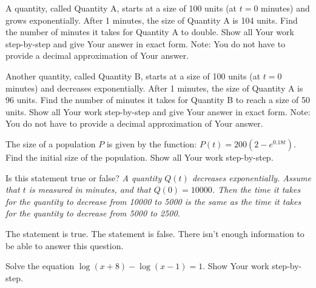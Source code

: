 \documentclass[11pt,answers]{exam}
\begin{document}
\begin{questions}


\addpoints



\question[2] A quantity, called Quantity A, starts at a size of 100 units (at $t=0$ minutes) and grows exponentially. After 1 minutes, the size of Quantity A is 104 units. Find the number of minutes it takes for Quantity A to double.    Show all Your work step-by-step and give Your answer in exact form. Note: You do not have to provide a decimal approximation of Your answer.


\fillwithdottedlines{3cm}

\question[2] Another quantity, called Quantity B, starts at a size of 100 units (at $t=0$ minutes) and decreases exponentially. After 1 minutes, the size of Quantity A is 96 units. Find the number of minutes it takes for Quantity B to reach a size of 50 units.     Show all Your work step-by-step and give Your answer in exact form. Note: You do not have to provide a decimal approximation of Your answer.

\fillwithdottedlines{3cm}

\question[2] The size of a population $P$ is given by the function: $\displaystyle P(t)=200(2-e^{0.18t})$. Find the initial size of the population. Show all Your work step-by-step.

\fillwithdottedlines{3cm}

\bonusquestion[1] Is this statement true or false? {\emph {A quantity $Q(t)$ decreases exponentially. Assume that $t$ is measured in minutes, and that $Q(0)=10000$. Then the time it takes for the quantity to decrease from 10000 to 5000 is the same as the time it takes for the quantity to decrease from 5000 to 2500. }}

\begin{oneparchoices}
\choice The statement is true.
\choice The statement is false.
\choice There isn't enough information to be able to answer this question.
\end{oneparchoices}

\question[2] Solve the equation $\displaystyle \log(x+8)-\log(x-1)=1$. Show Your work step-by-step.

	\fillwithdottedlines{2cm}


\end{questions}
\end{document}
